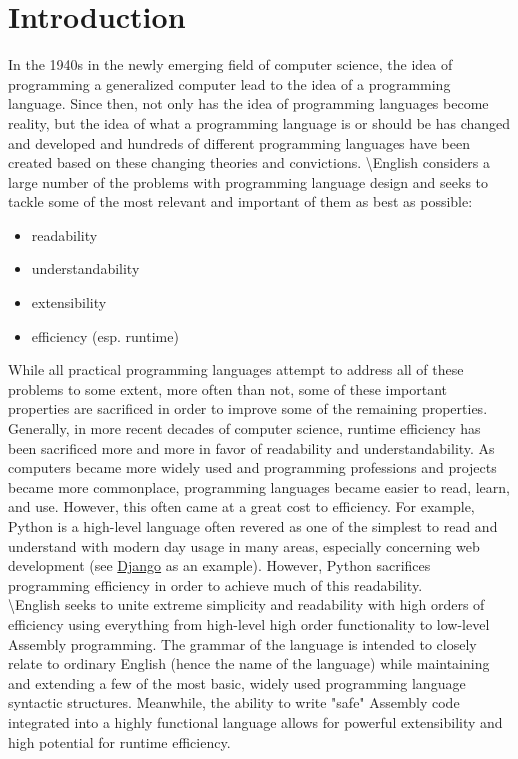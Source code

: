 \documentclass{article}
\title{\name{}}
\date{09/18/2015}
\author{Connor Davey}
\newcommand{\name}{\textbackslash{}English}
\begin{document}
\maketitle
\newpage
	
\tableofcontents
\newpage

\section{Introduction}
In the 1940s in the newly emerging field of computer science, the idea of programming a generalized computer lead to the idea of a programming language. Since then, not only has the idea of programming languages become reality, but the idea of what a programming language is or should be has changed and developed and hundreds of different programming languages have been created based on these changing theories and convictions.
\name{} considers a large number of the problems with programming language design and seeks to tackle some of the most relevant and important of them as best as possible:
	\begin{multicols}{2}
	\begin{itemize}
		\item readability
		\item understandability
		\item extensibility
		\item efficiency (esp. runtime)
	\end{itemize}
	\end{multicols}
\indent While all practical programming languages attempt to address all of these problems to some extent, more often than not, some of these important properties are sacrificed in order to improve some of the remaining properties. Generally, in more recent decades of computer science, runtime efficiency has been sacrificed more and more in favor of readability and understandability. As computers became more widely used and programming professions and projects became more commonplace, programming languages became easier to read, learn, and use. However, this often came at a great cost to efficiency. For example, Python is a high-level language often revered as one of the simplest to read and understand\cite{Sanner99} with modern day usage in many areas, especially concerning web development (see \href{https://www.djangoproject.com/}{Django} as an example). However, Python sacrifices programming efficiency in order to achieve much of this readability\cite{PythonVsJava}\cite{PythonVsC}\cite{Cai05}.\\
\indent \name{} seeks to unite extreme simplicity and readability with high orders of efficiency using everything from high-level high order functionality to low-level Assembly programming. The grammar of the language is intended to closely relate to ordinary English (hence the name of the language) while maintaining and extending a few of the most basic, widely used programming language syntactic structures. Meanwhile, the ability to write "safe" Assembly code integrated into a highly functional language allows for powerful extensibility and high potential for runtime efficiency.
	
\end{document}

